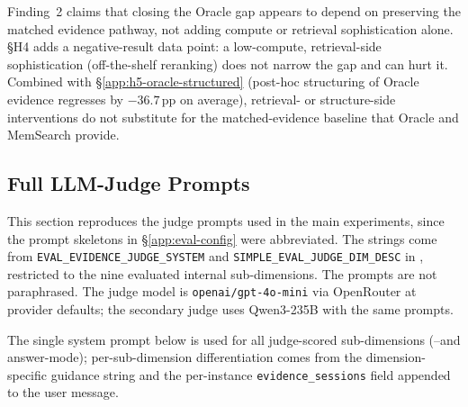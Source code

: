 Finding~2 claims that closing the Oracle gap appears to depend on preserving the matched evidence pathway, not adding compute or retrieval sophistication alone. \S H4 adds a negative-result data point: a low-compute, retrieval-side sophistication (off-the-shelf reranking) does not narrow the gap and can hurt it. Combined with \S\ref{app:h5-oracle-structured} (post-hoc structuring of Oracle evidence regresses by $-36.7$\,pp on average), retrieval- or structure-side interventions do not substitute for the matched-evidence baseline that Oracle and MemSearch provide.

\subsection{Full LLM-Judge Prompts}
\label{app:full-judge-prompts}

This section reproduces the judge prompts used in the main experiments, since the prompt skeletons in \S\ref{app:eval-config} were abbreviated. The strings come from \texttt{EVAL\_EVIDENCE\_JUDGE\_SYSTEM} and \texttt{SIMPLE\_EVAL\_JUDGE\_DIM\_DESC} in , restricted to the nine evaluated internal sub-dimensions. The prompts are not paraphrased. The judge model is \texttt{openai/gpt-4o-mini} via OpenRouter at provider defaults; the secondary judge uses Qwen3-235B with the same prompts.

The single system prompt below is used for all judge-scored sub-dimensions (\DTwoID--\DFourID and \DFiveID answer-mode); per-sub-dimension differentiation comes from the dimension-specific guidance string and the per-instance \texttt{evidence\_sessions} field appended to the user message.

